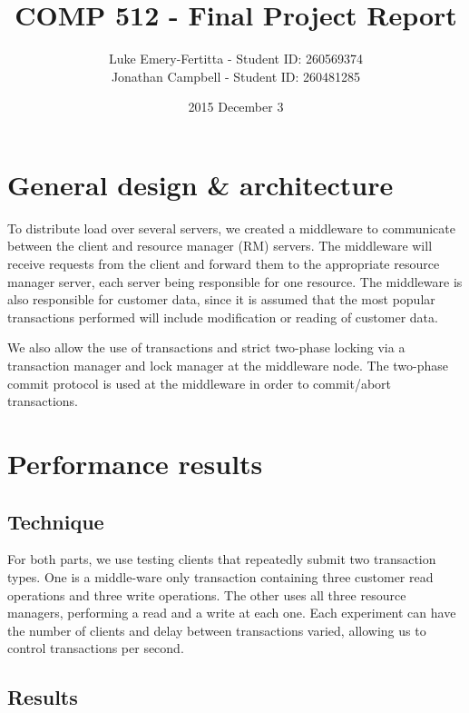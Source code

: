 \documentclass[11pt]{article}
\begin{document}
\title{COMP 512 - Final Project Report}
\author{Luke Emery-Fertitta - Student ID: 260569374 \\ Jonathan Campbell - Student ID: 260481285}
\date{2015 December 3}
\maketitle

\section*{General design & architecture}

To distribute load over several servers, we created a middleware to communicate between the client and resource manager (RM) servers. The middleware will receive requests from the client and forward them to the appropriate resource manager server, each server being responsible for one resource. The middleware is also responsible for customer data, since it is assumed that the most popular transactions performed will include modification or reading of customer data.  \par

We also allow the use of transactions and strict two-phase locking via a transaction manager and lock manager at the middleware node. The two-phase commit protocol is used at the middleware in order to commit/abort transactions.

\section*{Performance results}

\subsection*{Technique}

For both parts, we use testing clients that repeatedly submit two transaction types. One is a middle-ware only transaction containing three customer read operations and three write operations. The other uses all three resource managers, performing a read and a write at each one. Each experiment can have the number of clients and delay between transactions varied, allowing us to control transactions per second.

\subsection*{Results}
\end{document}
